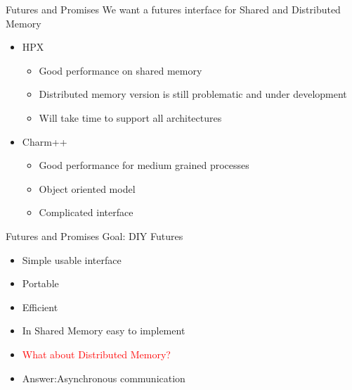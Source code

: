\documentclass[svgnames]{beamer}
\begin{document}
\begin{frame}{Futures and Promises}
We want a futures interface for Shared and Distributed Memory
\begin{itemize}
	\item HPX
	\begin{itemize}
		\item Good performance on shared memory
		\item Distributed memory version is still problematic and under development
		\item Will take time to support all architectures 
	\end{itemize}
	\item Charm++
	\begin{itemize}
		\item Good performance for medium grained processes
		\item Object oriented model
		\item Complicated interface
	\end{itemize}
\end{itemize}
\end{frame}
\begin{frame}{Futures and Promises}
Goal: DIY Futures
\begin{itemize}
	\item Simple usable interface
	\item Portable
	\item Efficient
\end{itemize}
 
\begin{itemize}
	\item In Shared Memory easy to implement
	\item<2-> \textcolor{red}{What about Distributed Memory?}
	\item<3-> Answer:Asynchronous communication
\end{itemize}
\end{frame}
\end{document}
